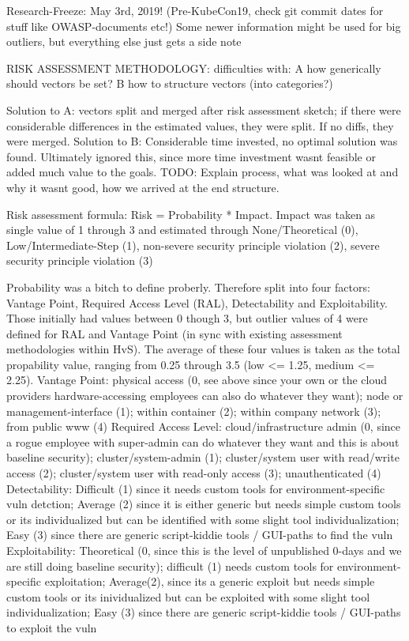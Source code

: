Research-Freeze: May 3rd, 2019! (Pre-KubeCon19, check git commit dates for stuff like OWASP-documents etc!)
Some newer information might be used for big outliers, but everything else just gets a side note

RISK ASSESSMENT METHODOLOGY:
difficulties with: 
A how generically should vectors be set?
B how to structure vectors (into categories?) 

Solution to A: vectors split and merged after risk assessment sketch; if there were considerable differences in the estimated values, they were split. If no diffs, they were merged.
Solution to B: Considerable time invested, no optimal solution was found. Ultimately ignored this, since more time investment wasnt feasible or added much value to the goals. TODO: Explain process, what was looked at and why it wasnt good, how we arrived at the end structure.

Risk assessment formula:
Risk = Probability * Impact.
Impact was taken as single value of 1 through 3  and estimated through None/Theoretical (0), Low/Intermediate-Step (1), non-severe security principle violation (2), severe security principle violation (3)

Probability was a bitch to define proberly. Therefore split into four factors: Vantage Point, Required Access Level (RAL), Detectability and Exploitability. Those initially had values between 0 though 3, but outlier values of 4  were defined for RAL and Vantage Point (in sync with existing assessment methodologies within HvS).
The average of these four values is taken as the total propability value, ranging from 0.25 through 3.5 (low <= 1.25, medium <= 2.25).
Vantage Point: physical access (0, see above since your own or the cloud providers hardware-accessing employees can also do whatever they want); node or management-interface (1); within container (2); within company network (3); from public www (4)
Required Access Level: cloud/infrastructure admin (0, since a rogue employee with super-admin can do whatever they want and this is about baseline security); cluster/system-admin (1); cluster/system user with read/write access (2); cluster/system user with read-only access (3); unauthenticated (4)
Detectability: Difficult (1) since it needs custom tools for environment-specific vuln detction; Average (2) since it is either generic but needs simple custom tools or its individualized but can be identified with some slight tool individualization; Easy (3) since there are generic script-kiddie tools / GUI-paths to find the vuln
Exploitability: Theoretical (0, since this is the level of unpublished 0-days and we are still doing baseline security); difficult (1) needs custom tools for environment-specific exploitation; Average(2), since its a generic exploit but needs simple custom tools or its inividualized but can be exploited with some slight tool individualization; Easy (3) since there are generic script-kiddie tools / GUI-paths to exploit the vuln


